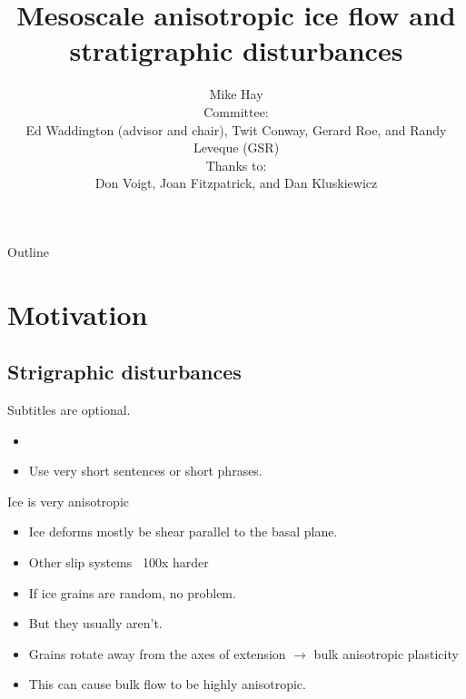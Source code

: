 \documentclass{beamer}
\title[Ice anisotropy] %
{Mesoscale anisotropic ice flow and stratigraphic disturbances}
\author[Michael Hay] %
{ 
  Mike Hay\inst{1}\\
  \footnotesize{
    Committee:\\
    Ed Waddington (advisor and chair),  Twit Conway, Gerard Roe, and Randy Leveque (GSR)\\
    Thanks to:\\
    Don Voigt, Joan Fitzpatrick, and Dan Kluskiewicz
    }
  }
\institute[University of Washington] %
{
  \inst{1}%
  Department of Earth and Space Sciences\\
  University of Washington
  \and
  }
\date[CFP 2003] %
\begin{document}
\begin{frame}
  \titlepage
\end{frame}

\begin{frame}{Outline}
  \tableofcontents
\end{frame}





\section{Motivation}

\subsection{Strigraphic disturbances}

\begin{frame}{}{Subtitles are optional.}

  \begin{itemize}
  \item
    
  \item
    Use very short sentences or short phrases.
  \end{itemize}
\end{frame}

\begin{frame}{Ice is very anisotropic}

  
  \begin{itemize}
  \item Ice deforms mostly be shear parallel to the basal plane.
  \item Other slip systems ~100x harder
    \item If ice grains are random, no problem.
    \pause \item But they usually aren't.
    \pause \item Grains rotate away from the axes of extension $\rightarrow$ bulk anisotropic plasticity
  \item This can cause bulk flow to be highly anisotropic.
  \end{itemize}
\end{frame}
\end{document}
